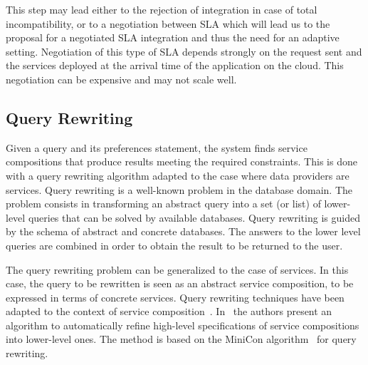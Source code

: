 This step may lead either to the rejection of integration in case of total incompatibility, or to a negotiation between SLA which will lead us to the proposal for a negotiated SLA integration and thus the need for an adaptive setting.
%
%
%
 Negotiation of this type of SLA depends strongly on the request sent and the services deployed at the arrival time of the application on the cloud. This negotiation can be expensive and may not scale well.

  
\subsection{Query Rewriting}
\label{sec:queryRew}
Given a query and its preferences statement, the system  finds  service compositions that produce results   meeting the required constraints. This is done with a query rewriting algorithm adapted to the case where data providers are services. 
Query rewriting is a well-known problem in the database domain.
The problem consists in transforming an abstract query into a set (or list) of lower-level queries that can be solved by  available databases.
Query rewriting is guided by the schema of  abstract and concrete databases.
The answers to the lower level queries are combined in order to obtain the result to be returned to the user.

The query rewriting problem can be generalized to the case of services.
In this case, the query to be rewritten is seen as an abstract service composition, to be expressed in terms of concrete services.
Query rewriting techniques have been adapted to the context of service composition~\cite{BBM10,ZLC11,CostaAMR13}. 
In~\cite{CostaAMR13} the authors present an algorithm to automatically refine high-level specifications of service compositions into lower-level ones. 
The method is based on the MiniCon algorithm~\cite{PH01} for query rewriting.


